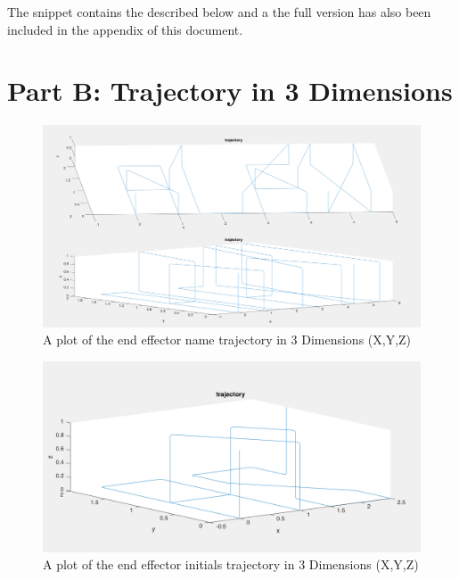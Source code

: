\documentclass[a4paper, 10pt]{article}
\begin{document}
The snippet contains the described below and a the full version has also been included in the appendix of this document.


\section{Part B: Trajectory in 3 Dimensions}

\begin{figure}[H]
  \includegraphics[width=\linewidth]{images/T2}
  \caption{A plot of the end effector name trajectory in 3 Dimensions (X,Y,Z)}
  \label{fig:A plot of the end effector name trajectory in 3 Dimensions (X,Y,Z)}
\end{figure}

\begin{figure}[H]
  \includegraphics[width=\linewidth]{images/AS}
  \caption{A plot of the end effector initials trajectory in 3 Dimensions (X,Y,Z)}
  \label{fig:A plot of the end effector initials trajectory in 3 Dimensions (X,Y,Z)}
\end{figure}

\end{document}
